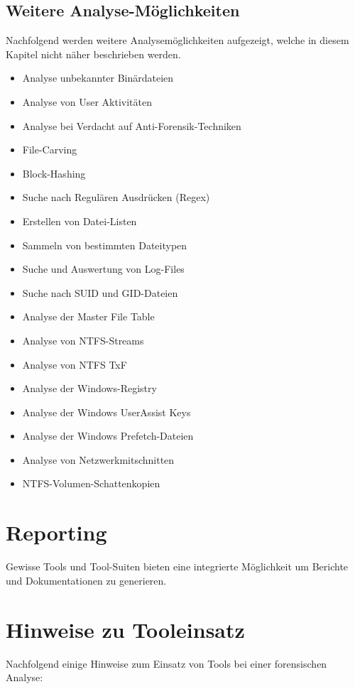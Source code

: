 \subsection{Weitere Analyse-Möglichkeiten}
Nachfolgend werden weitere Analysemöglichkeiten aufgezeigt, welche in diesem Kapitel nicht näher beschrieben werden.
\begin{itemize}
\item Analyse unbekannter Binärdateien
\item Analyse von User Aktivitäten
\item Analyse bei Verdacht auf Anti-Forensik-Techniken
\item File-Carving
\item Block-Hashing
\item Suche nach Regulären Ausdrücken (Regex)
\item Erstellen von Datei-Listen
\item Sammeln von bestimmten Dateitypen
\item Suche und Auswertung von Log-Files
\item Suche nach SUID und GID-Dateien
\item Analyse der Master File Table
\item Analyse von NTFS-Streams
\item Analyse von NTFS TxF
\item Analyse der Windows-Registry
\item Analyse der Windows UserAssist Keys
\item Analyse der Windows Prefetch-Dateien
\item Analyse von Netzwerkmitschnitten
\item NTFS-Volumen-Schattenkopien
\end{itemize}


\section{Reporting}
Gewisse Tools und Tool-Suiten bieten eine integrierte Möglichkeit um Berichte und Dokumentationen zu generieren. 


\section{Hinweise zu Tooleinsatz}
Nachfolgend einige Hinweise zum Einsatz von Tools bei einer forensischen Analyse:

